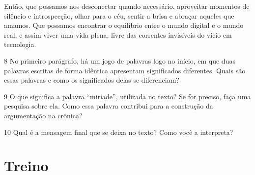 \begin{myquote}
Então, que possamos nos desconectar quando necessário, aproveitar
momentos de silêncio e introspecção, olhar para o céu, sentir a brisa e
abraçar aqueles que amamos. Que possamos encontrar o equilíbrio entre o
mundo digital e o mundo real, e assim viver uma vida plena, livre das
correntes invisíveis do vício em tecnologia.

\end{myquote}




\num{8} No primeiro parágrafo, há um jogo de palavras logo no início, em
que duas palavras escritas de forma idêntica apresentam significados
diferentes. Quais são essas palavras e como os significados delas se
diferenciam?


\num{9} O que significa a palavra ``miríade'', utilizada no texto? Se
for preciso, faça uma pesquisa sobre ela. Como essa palavra contribui
para a construção da argumentação na crônica?


\num{10} Qual é a mensagem final que se deixa no texto? Como você a
interpreta?


\section*{Treino}



